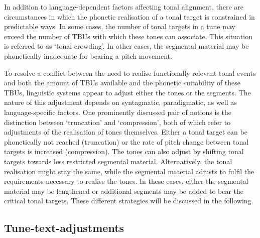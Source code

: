 In addition to language-dependent factors affecting tonal alignment, there are circumstances in which the phonetic realisation of a tonal target is constrained in predictable ways. In some cases, the number of tonal targets in a tune may exceed the number of TBUs with which these tones can associate. This situation is referred to as ‘tonal crowding’. In other cases, the segmental material may be phonetically inadequate for bearing a pitch movement.

To resolve a conflict between the need to realise functionally relevant tonal events and both the amount of TBUs available and the phonetic suitability of these TBUs, linguistic systems appear to adjust either the tones or the segments. The nature of this adjustment depends on syntagmatic, paradigmatic, as well as language-specific factors. One prominently discussed pair of notions is the distinction between ‘truncation’ and ‘compression’, both of which refer to adjustments of the realisation of tones themselves. Either a tonal target can be phonetically not reached (truncation) or the rate of pitch change between tonal targets is increased (compression). The tones can also adjust by shifting tonal targets towards less restricted segmental material. Alternatively, the tonal realisation might stay the same, while the segmental material adjusts to fulfil the requirements necessary to realise the tones. In these cases, either the segmental material may be lengthened or additional segments may be added to bear the critical tonal targets. These different strategies will be discussed in the following.

\subsection{Tune-text-adjustments}\label{sec:2.4.1}
